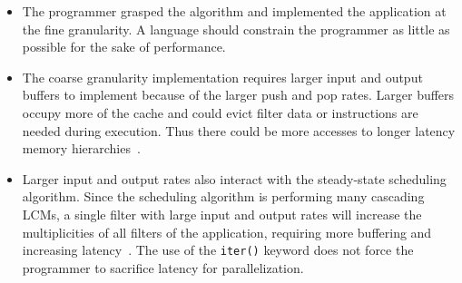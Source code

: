 \begin{itemize}

\item The programmer grasped the algorithm and implemented the
  application at the fine granularity.  A language should constrain
  the programmer as little as possible for the sake of performance.

\item The coarse granularity implementation requires larger input and
output buffers to implement because of the larger push and pop rates.
Larger buffers occupy more of the cache and could evict filter data or
instructions are needed during execution.  Thus there could be more
accesses to longer latency memory hierarchies~\cite{sermulins-lctes05}.

\item Larger input and output rates also interact with the
  steady-state scheduling algorithm.  Since the scheduling algorithm
  is performing many cascading LCMs, a single filter with large input
  and output rates will increase the multiplicities of all filters of the
  application, requiring more buffering and increasing
  latency~\cite{karczmarek-lctes03}.  The use of the {\tt iter()}
  keyword does not force the programmer to sacrifice latency for
  parallelization.

\end{itemize}

